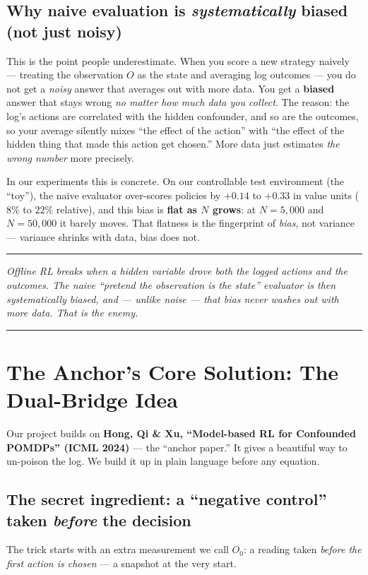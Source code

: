 \documentclass[11pt]{article}
\newenvironment{takeaway}
  {\par\vspace{4pt}\noindent\begin{center}\begin{minipage}{0.94\linewidth}%
   \color{black!88}\rule{\linewidth}{0.7pt}\par\vspace{3pt}\small\itshape}
  {\par\vspace{3pt}\rule{\linewidth}{0.7pt}\end{minipage}\end{center}\vspace{4pt}}
\newcommand{\Ob}{O_0}
\begin{document}
\subsection{Why naive evaluation is \emph{systematically} biased (not just noisy)}
This is the point people underestimate. When you score a new strategy naively ---
treating the observation $O$ as the state and averaging log outcomes --- you do not
get a \emph{noisy} answer that averages out with more data. You get a \textbf{biased}
answer that stays wrong \emph{no matter how much data you collect}. The reason: the
log's actions are correlated with the hidden confounder, and so are the outcomes, so
your average silently mixes ``the effect of the action'' with ``the effect of the
hidden thing that made this action get chosen.'' More data just estimates \emph{the
wrong number} more precisely.

In our experiments this is concrete. On our controllable test environment (the
``toy''), the naive evaluator over-scores policies by $+0.14$ to $+0.33$ in value
units ($8\%$ to $22\%$ relative), and this bias is \textbf{flat as $N$ grows}: at
$N=5{,}000$ and $N=50{,}000$ it barely moves. That flatness is the fingerprint of
\emph{bias}, not variance --- variance shrinks with data, bias does not.

\begin{takeaway}
Offline RL breaks when a hidden variable drove both the logged actions and the
outcomes. The naive ``pretend the observation is the state'' evaluator is then
\emph{systematically} biased, and --- unlike noise --- that bias never washes out
with more data. That is the enemy.
\end{takeaway}

\section{The Anchor's Core Solution: The Dual-Bridge Idea}

Our project builds on \textbf{Hong, Qi \& Xu, ``Model-based RL for Confounded
POMDPs'' (ICML 2024)} --- the ``anchor paper.'' It gives a beautiful way to
un-poison the log. We build it up in plain language before any equation.

\subsection{The secret ingredient: a ``negative control'' taken \emph{before} the decision}
The trick starts with an extra measurement we call $\Ob$: a reading taken
\emph{before the first action is chosen} --- a snapshot at the very start.
\end{document}
